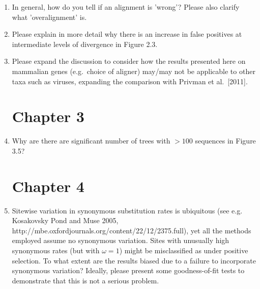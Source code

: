 \begin{enumerate}
{
}

\item{ In general, how do you tell if an alignment is 'wrong'? Please also
clarify what 'overalignment' is.

}

\item{ Please explain in more detail why there is an increase in false
positives at intermediate levels of divergence in Figure 2.3.

}

\item{ Please expand the discussion to consider how the results presented
here on mammalian genes (e.g.\ choice of aligner) may/may not be
applicable to other taxa such as viruses, expanding the comparison
with Privman et al.\ [2011].

}

\section{Chapter 3}

\item{ Why are there are significant number of trees with $>100$ sequences in
Figure 3.5?

}

\section{Chapter 4}

\item{ Sitewise variation in
  synonymous substitution rates is ubiquitous (see e.g. Kosakovsky
  Pond and Muse 2005, http://mbe.oxfordjournals.org/content/22/12/2375.full), yet all the
  methods employed assume no synonymous variation. Sites with
  unusually high synonymous rates (but with $\omega=1$) might be
  misclassified as under positive selection. To what extent are the
  results biased due to a failure to incorporate synonymous variation?
  Ideally, please present some goodness-of-fit tests to demonstrate
  that this is not a serious problem.

}
\end{enumerate}

